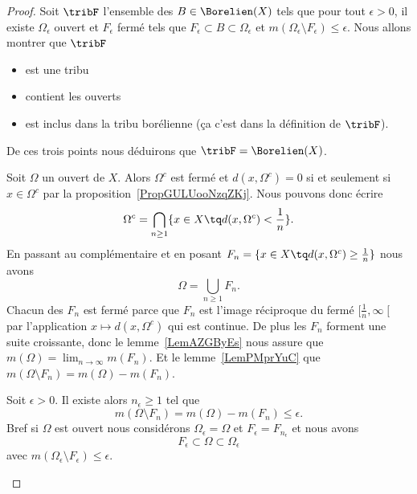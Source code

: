 \begin{proof}
	Soit \( \tribF\) l'ensemble des \( B\in\Borelien(X)\) tels que pour tout \( \epsilon>0\), il existe \( \Omega_{\epsilon}\) ouvert et \( F_{\epsilon}\) fermé tels que \( F_{\epsilon}\subset B\subset \Omega_{\epsilon}\) et \( m(\Omega_{\epsilon}\setminus F_{\epsilon})\leq \epsilon\). Nous allons montrer que \( \tribF\)
	\begin{itemize}
		\item est une tribu
		\item contient les ouverts
		\item est inclus dans la tribu borélienne (ça c'est dans la définition de \( \tribF\)).
	\end{itemize}
	De ces trois points nous déduirons que \( \tribF=\Borelien(X)\).
	\begin{subproof}
		Soit \( \Omega\) un ouvert de \( X\). Alors \( \Omega^c\) est fermé et \( d(x,\Omega^c)=0\) si et seulement si \( x\in \Omega^c\) par la proposition~\ref{PropGULUooNzqZKj}. Nous pouvons donc écrire
		\begin{equation}
			\Omega^c=\bigcap_{n\geq 1}\{ x\in X\tq d(x,\Omega^c)<\frac{1}{ n } \}.
		\end{equation}
		En passant au complémentaire et en posant \( F_n=\{ x\in X\tq d(x,\Omega^c)\geq \frac{1}{ n } \}\) nous avons
		\begin{equation}
			\Omega=\bigcup_{n\geq 1}F_n.
		\end{equation}
		Chacun des \( F_n\) est fermé parce que \( F_n\) est l'image réciproque du fermé \( \mathopen[ \frac{1}{ n } , \infty \mathclose[\) par l'application \( x\mapsto d(x,\Omega^c)\) qui est continue. De plus les \( F_n\) forment une suite croissante, donc le lemme~\ref{LemAZGByEs} nous assure que \( m(\Omega)=\lim_{n\to \infty}m(F_n)\). Et le lemme~\ref{LemPMprYuC} que \( m(\Omega\setminus F_n)=m(\Omega)-m(F_n)\).

		Soit \( \epsilon>0\). Il existe alors \( n_{\epsilon}\geq 1\) tel que
		\begin{equation}
			m(\Omega\setminus F_n)=m(\Omega)-m(F_n)\leq \epsilon.
		\end{equation}
		Bref si \( \Omega\) est ouvert nous considérons \( \Omega_{\epsilon}=\Omega\) et \( F_{\epsilon}=F_{n_{\epsilon}}\) et nous avons
		\begin{equation}
			F_{\epsilon}\subset \Omega\subset \Omega_{\epsilon}
		\end{equation}
		avec \( m(\Omega_{\epsilon}\setminus F_{\epsilon})\leq \epsilon\).


\end{subproof}
\end{proof}
